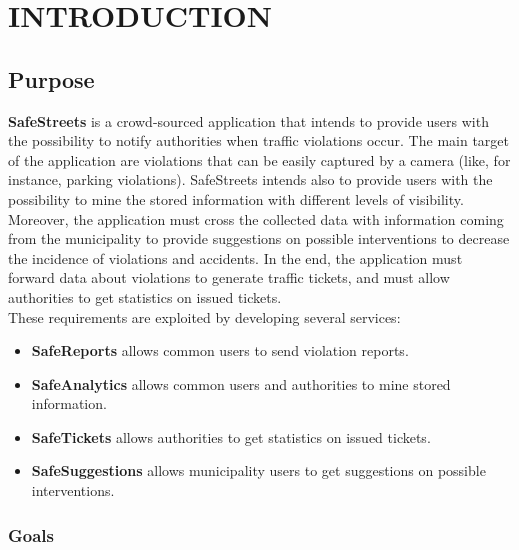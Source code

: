 \documentclass[a4paper]{article}
\begin{document}

\newpage
{}

\tableofcontents

\newpage
{}

\section{INTRODUCTION}\label{introduction}

\subsection{Purpose}

\textbf{SafeStreets} is a crowd-sourced application that intends to
provide users with the possibility to notify authorities when traffic
violations occur. The main target of the application are violations that
can be easily captured by a camera (like, for instance, parking
violations). SafeStreets intends also to provide users with the
possibility to mine the stored information with different levels of
visibility. Moreover, the application must cross the collected data with
information coming from the municipality to provide suggestions on
possible interventions to decrease the incidence of violations and
accidents. In the end, the application must forward data about
violations to generate traffic tickets, and must allow authorities to
get statistics on issued tickets.
\medskip\\
These requirements are exploited by developing several services:
\begin{itemize}
\item
  \textbf{SafeReports} allows common users to send violation reports.
\item
  \textbf{SafeAnalytics} allows common users and authorities to mine
  stored information.
\item
  \textbf{SafeTickets} allows authorities to get statistics on issued
  tickets.
\item
  \textbf{SafeSuggestions} allows municipality users to get suggestions
  on possible interventions.
\end{itemize}

\subsubsection{Goals}
\end{document}
